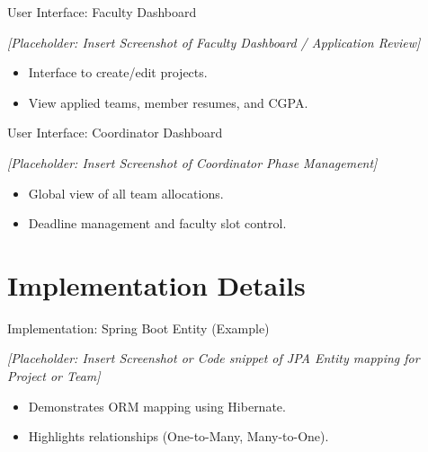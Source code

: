 \documentclass[aspectratio=169]{beamer}
\begin{document}
\begin{frame}{User Interface: Faculty Dashboard}
    \begin{center}
        \textit{[Placeholder: Insert Screenshot of Faculty Dashboard / Application Review]}
    \end{center}
    \vspace{1cm}
    \begin{itemize}
        \item Interface to create/edit projects.
        \item View applied teams, member resumes, and CGPA.
    \end{itemize}
\end{frame}

\begin{frame}{User Interface: Coordinator Dashboard}
    \begin{center}
        \textit{[Placeholder: Insert Screenshot of Coordinator Phase Management]}
    \end{center}
    \vspace{1cm}
    \begin{itemize}
        \item Global view of all team allocations.
        \item Deadline management and faculty slot control.
    \end{itemize}
\end{frame}

\section{Implementation Details}

\begin{frame}[fragile]{Implementation: Spring Boot Entity (Example)}
    \begin{center}
        \textit{[Placeholder: Insert Screenshot or Code snippet of JPA Entity mapping for Project or Team]}
    \end{center}
    \vspace{1cm}
    \begin{itemize}
        \item Demonstrates ORM mapping using Hibernate.
        \item Highlights relationships (One-to-Many, Many-to-One).
    \end{itemize}
\end{frame}
\end{document}
